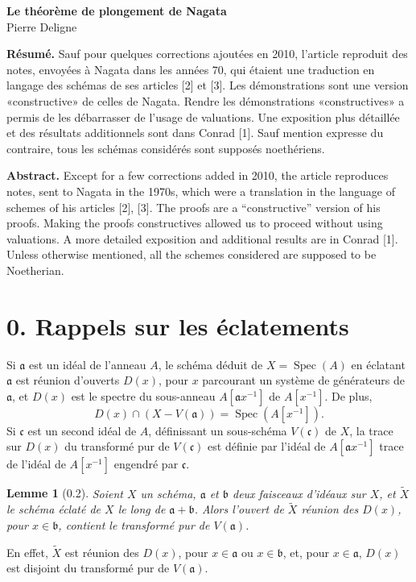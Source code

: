 \documentclass[10pt,a4paper]{article}
\newcommand{\Spec}{\operatorname{Spec}}
\theoremstyle{deligne}
\newtheorem*{lemma*}{Lemme}
\newcommand{\heading}[1]{\vspace{0.65em}\noindent{\bfseries #1}\quad}
\begin{document}
\begin{center}
{\Large\bfseries Le théorème de plongement de Nagata}\\[0.4em]
{\large Pierre Deligne}
\end{center}

\textbf{Résumé.} Sauf pour quelques corrections ajoutées en 2010, l'article reproduit des notes, envoyées à Nagata dans les années 70, qui étaient une traduction en langage des schémas de ses articles [2] et [3]. Les démonstrations sont une version «constructive» de celles de Nagata. Rendre les démonstrations «constructives» a permis de les débarrasser de l'usage de valuations. Une exposition plus détaillée et des résultats additionnels sont dans Conrad [1]. Sauf mention expresse du contraire, tous les schémas considérés sont supposés noethériens.

\textbf{Abstract.} Except for a few corrections added in 2010, the article reproduces notes, sent to Nagata in the 1970s, which were a translation in the language of schemes of his articles [2], [3]. The proofs are a ``constructive'' version of his proofs. Making the proofs constructives allowed us to proceed without using valuations. A more detailed exposition and additional results are in Conrad [1]. Unless otherwise mentioned, all the schemes considered are supposed to be Noetherian.

\section*{0. Rappels sur les éclatements}

\heading{0.1.}
Si \(\mathfrak a\) est un idéal de l'anneau \(A\), le schéma déduit de \(X=\Spec(A)\) en éclatant \(\mathfrak a\) est réunion d'ouverts \(D(x)\), pour \(x\) parcourant un système de générateurs de \(\mathfrak a\), et \(D(x)\) est le spectre du sous-anneau \(A[\mathfrak a x^{-1}]\) de \(A[x^{-1}]\). De plus,
\[
D(x)\cap (X-V(\mathfrak a))=\Spec(A[x^{-1}]).
\]
Si \(\mathfrak c\) est un second idéal de \(A\), définissant un sous-schéma \(V(\mathfrak c)\) de \(X\), la trace sur \(D(x)\) du transformé pur de \(V(\mathfrak c)\) est définie par l'idéal de \(A[\mathfrak a x^{-1}]\) trace de l'idéal de \(A[x^{-1}]\) engendré par \(\mathfrak c\).

\begin{lemma*}[0.2]
Soient \(X\) un schéma, \(\mathfrak a\) et \(\mathfrak b\) deux faisceaux d'idéaux sur \(X\), et \(\widetilde X\) le schéma éclaté de \(X\) le long de \(\mathfrak a+\mathfrak b\). Alors l'ouvert de \(\widetilde X\) réunion des \(D(x)\), pour \(x\in\mathfrak b\), contient le transformé pur de \(V(\mathfrak a)\).
\end{lemma*}
En effet, \(\widetilde X\) est réunion des \(D(x)\), pour \(x\in\mathfrak a\) ou \(x\in\mathfrak b\), et, pour \(x\in\mathfrak a\), \(D(x)\) est disjoint du transformé pur de \(V(\mathfrak a)\).
\end{document}
